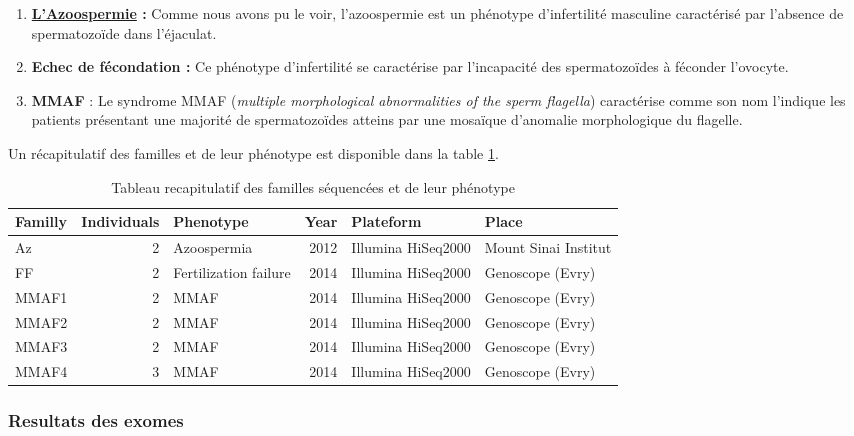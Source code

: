 \documentclass[12pt,twoside]{reedthesis}
\providecommand{\tightlist}{%
  \setlength{\itemsep}{0pt}\setlength{\parskip}{0pt}}
\theoremstyle{definition}
\theoremstyle{definition}
\theoremstyle{remark}
\begin{document}
  \begin{enumerate}
  \def\labelenumi{\arabic{enumi}.}
  \tightlist
  \item
    \textbf{\protect\hyperlink{infquant}{L'Azoospermie} :} Comme nous
    avons pu le voir, l'azoospermie est un phénotype d'infertilité
    masculine caractérisé par l'absence de spermatozoïde dans
    l'éjaculat.\\
  \item
    \textbf{Echec de fécondation :} Ce phénotype d'infertilité se
    caractérise par l'incapacité des spermatozoïdes à féconder
    l'ovocyte.\\
  \item
    \textbf{MMAF} : Le syndrome MMAF (\emph{multiple morphological
    abnormalities of the sperm flagella}) caractérise comme son nom
    l'indique les patients présentant une majorité de spermatozoïdes
    atteins par une mosaïque d'anomalie morphologique du flagelle.
  \end{enumerate}
  
  Un récapitulatif des familles et de leur phénotype est disponible dans
  la table \ref{tab:recapfam}.
  
  \begin{table}
  
  \caption{\label{tab:recapfam}Tableau recapitulatif des familles séquencées et de leur phénotype}
  \centering
  \begin{tabular}[t]{l|r|l|r|l|l}
  \hline
  Familly & Individuals & Phenotype & Year & Plateform & Place\\
  \hline
  Az & 2 & Azoospermia & 2012 & Illumina HiSeq2000 & Mount Sinai Institut\\
  \hline
  FF & 2 & Fertilization failure & 2014 & Illumina HiSeq2000 & Genoscope (Evry)\\
  \hline
  MMAF1 & 2 & MMAF & 2014 & Illumina HiSeq2000 & Genoscope (Evry)\\
  \hline
  MMAF2 & 2 & MMAF & 2014 & Illumina HiSeq2000 & Genoscope (Evry)\\
  \hline
  MMAF3 & 2 & MMAF & 2014 & Illumina HiSeq2000 & Genoscope (Evry)\\
  \hline
  MMAF4 & 3 & MMAF & 2014 & Illumina HiSeq2000 & Genoscope (Evry)\\
  \hline
  \end{tabular}
  \end{table}
  
  \subsubsection{Resultats des exomes}\label{resultats-des-exomes}
  
\end{document}
